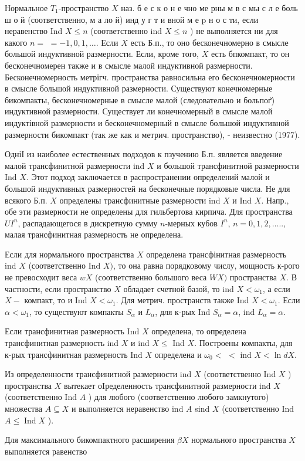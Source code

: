 \documentclass[10pt]{article}
\begin{document}
Нормальное $T_{1}$-пространство $X$ наз. б е с к о н е чно ме рны м в с мы с л е боль ш о й (соответственно, м а ло й) инд у г т и вной м е $\mathrm{p}$ н о с ти, если неравенство Ind $X \leqslant n$ (соответственно ind $X \leqslant n$ ) не выполняется ни для какого $n=$ $=-1,0,1, \ldots$. Если $X$ есть Б.п., то оно бесконечномерно в смысле большой индуктивной размерности. Если, кроме того, $X$ есть бпкомпакт, то он бесконечномерен также и в смысле малой индуктивной размерности. Бесконечномерность метрігч. пространства равносильна его бесконечномерности в смысле большой индуктивной размерности. Существуют конечномерные бикомпакты, бесконечномерные в смысле малой (следовательно и больпог̆) индуктивной размерности. Существует ли конечномерный в смысле малой индуктівной размерности и бесконечномерный в смысле большой индуктивной размерности бикомпакт (так же как и метрич. пространство), - неизвестно (1977).



ОдніІ из наиболее естественных подходов к пзучению Б.п. является введение малой трансфинитной размерности ind $X$ и большой трансфинитной размерности Ind $X$. Этот подход заключается в распространении определений малой и большой индуктивных размерностей на бесконечные порядковые числа. Не для всякого Б.п. $X$ определены трансфинитные размерности ind $X$ и Ind $X$. Напр., обе эти размерности не определены для гильбертова кирпича. Для пространства $U I^{n}$, распадающегося в дискретную сумму $n$-мерных кубов $I^{n}$, $n=0,1,2, \ldots$.., малая трансфинитная размерность не определена.



Если для нормального пространства $X$ определена трансфінитная размерность ind $X$ (соответственно Ind $X)$, то она равна порядковому числу, мощность к-рого не превосходит веса $w X$ (соответственно большого веса $W X)$ пространства $X$. В частности, если пространство $X$ обладает счетной базой, то ind $X<\omega_{1}$, а если $X-$ компакт, то и Ind $X<\omega_{1}$. Для метрич. пространств также Ind $X<\omega_{1}$. Если $\alpha<\omega_{1}$, то существуют компакты $S_{\alpha}$ и $L_{\alpha}$, для к-рых Ind $S_{\alpha}=\alpha$, ind $L_{\alpha}=\alpha$.



Если трансфинитная размерность Ind $X$ определена, то определена трансфинитная размерность ind $X$ и ind $X \leqslant$ Ind $X$. Построены компакты, для к-рых трансфинитная размерность Ind $X$ определена и $\omega_{0}<$ $<$ ind $X<\ln d X$.



Из определенности трансфинитной размерности ind $X$ (соответственно Ind $X$ ) пространства $X$ вытекает оIределенность трансфинитной размерности ind $X$ (соответственно Ind $A$ ) для любого (соответственно любого замкнутого) множества $A \subseteq X$ и выполняется неравенство ind $A$ sind $X$ (соответственно Ind $A \leqslant \operatorname{Ind} X$ ).



Для максимального бикомпактного расширения $\beta X$ нормального пространства $X$ выполняется равенство
\end{document}
